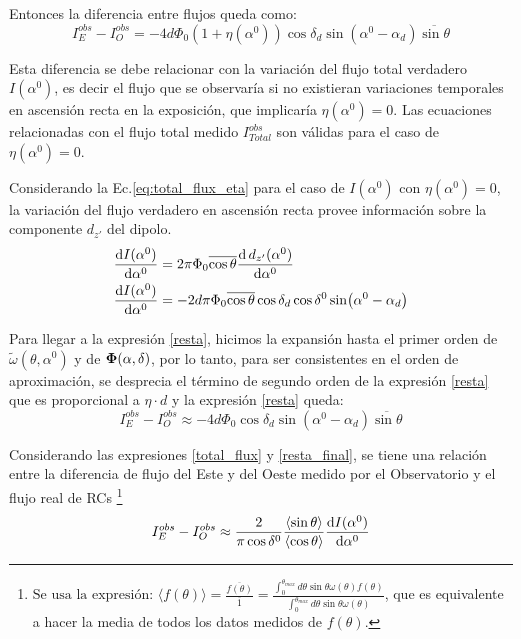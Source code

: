      Entonces la diferencia entre flujos queda como:
    \begin{equation}
        I^{obs}_E -  I^{obs}_O =-4d \Phi_0 (1+ \eta(\alpha^0)) \cos\delta_d \sin(\alpha^0  - \alpha_d)\overline{\sin\theta}
        \label{resta}
    \end{equation}

    Esta diferencia se debe relacionar con la variación del flujo total verdadero $I(\alpha^0)$, es decir el flujo que se observaría si no existieran variaciones temporales en ascensión recta en la exposición, que implicaría $\eta(\alpha^0)=0$. {Las ecuaciones relacionadas con el flujo total medido $I^{obs}_{Total}$ son válidas para el caso de $\eta(\alpha^0)=0$.}

  {  Considerando la Ec.\ref{eq:total_flux_eta} para el caso de $I(\alpha^0)$ con $\eta(\alpha^0)=0$, la variación del flujo verdadero en ascensión recta provee información sobre la componente $d_{z'}$ del dipolo.} 
    \begin{align}
        \dv{I(\alpha^0)}{\alpha^0}  & = 2\pi\Phi_0 \overline{\cos\theta} \dv{\,d_{z'}(\alpha^0) }{\alpha^0}\\ 
        \dv{I(\alpha^0)}{\alpha^0} &= -2d\pi\Phi_0 \overline{\cos\theta}\cos\delta_d \cos\delta^0 \sin(\alpha^0 - \alpha_d) \label{total_flux}
    \end{align}

    Para llegar a la expresión \ref{resta}, hicimos la expansión hasta el primer orden de $\tilde{\omega}(\theta, \alpha^0)$ y de $\bf\Phi(\alpha, \delta)$, por lo tanto, para ser consistentes en el orden de aproximación, se desprecia el término de segundo orden de la expresión \ref{resta} que es proporcional a $\eta \cdot d$ y la expresión \ref{resta} queda:
        \begin{equation}
            I^{obs}_E -  I^{obs}_O \approx -4d \Phi_0 \cos\delta_d \sin(\alpha^0  - \alpha_d)\overline{\sin\theta}
            \label{resta_final}
        \end{equation}

    Considerando las expresiones \ref{total_flux} y \ref{resta_final}, se tiene una relación entre la diferencia de flujo del Este y del Oeste medido por el Observatorio  y el flujo real de RCs \footnote{
    $
        \text{Se usa la expresión:  }
        \langle f(\theta) \rangle = \frac{\overline{f(\theta)}}{\overline{1}} = \displaystyle\frac{\int_{0}^{\theta_{max}} d \theta \sin\theta \omega(\theta) f(\theta) }{\int_{0}^{\theta_{max}} d \theta \sin\theta \omega(\theta)} 
    $,  
    que es equivalente a hacer la media  de todos los datos medidos de $f(\theta)$.} %
    \begin{equation}
        I^{obs}_E -  I^{obs}_O \approx  \frac{2}{\pi \cos \delta^0} \frac{\langle\sin\theta \rangle}{\langle\cos\theta \rangle}\dv{I(\alpha^0)}{\alpha^0} 
        \label{eq:final}
    \end{equation}
   

